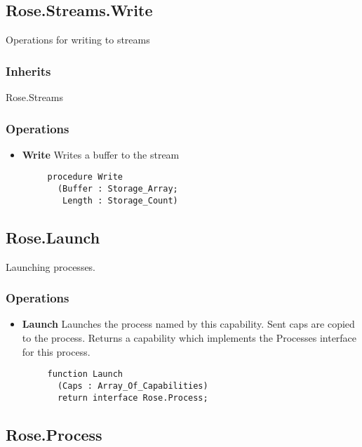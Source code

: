 \subsection{Rose.Streams.Write}

Operations for writing to streams

\subsubsection{Inherits}

Rose.Streams

\subsubsection{Operations}

\begin{itemize}
    \item \textbf{Write} Writes a buffer to the stream
    
    \begin{verbatim}
     procedure Write
       (Buffer : Storage_Array;
        Length : Storage_Count)
    \end{verbatim}
\end{itemize}

\subsection{Rose.Launch}

Launching processes.

\subsubsection{Operations}

\begin{itemize}
    \item \textbf{Launch} Launches the process named by this capability.  Sent caps are copied to the process.  Returns a capability which implements the Processes interface for this process.

    \begin{verbatim}
     function Launch
       (Caps : Array_Of_Capabilities)
       return interface Rose.Process;    
    \end{verbatim}
    
\end{itemize}

\subsection{Rose.Process}

